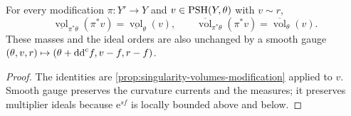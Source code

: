 \begin{proposition}\label{prop:ruled-pullback-ordinary-volumes}
For every modification $\pi\colon Y'\to Y$ and $v\in\mathrm{PSH}(Y,\theta)$ with $v\sim r$,
\[
 \underline{\operatorname{vol}}_{\pi^*\theta}(\pi^*v)
       =\underline{\operatorname{vol}}_\theta(v),\qquad
 \overline{\operatorname{vol}}_{\pi^*\theta}(\pi^*v)
       =\overline{\operatorname{vol}}_\theta(v).
\]
These masses and the ideal orders are also unchanged by a smooth gauge $(\theta,v,r)\mapsto(\theta+\mathrm{dd}^{\mathrm{c}} f,v-f,r-f)$.
\end{proposition}
\begin{proof}
The identities are \cref{prop:singularity-volumes-modification} applied to $v$. Smooth gauge preserves the curvature currents and the measures; it preserves multiplier ideals because $\mathrm e^{sf}$ is locally bounded above and below.
\end{proof}

